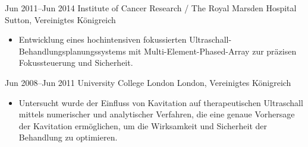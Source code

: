\documentclass[german, print]{cv-style-wide-de}
\begin{document}
\begin{entrylist}
\entry
  {Jun 2011--Jun 2014}
  {Institute of Cancer Research / The Royal Marsden Hospital}
  {Sutton, Vereinigtes Königreich}
  {%
   \begin{itemize}
     \item Entwicklung eines hochintensiven fokussierten Ultraschall-Behandlungsplanungssystems mit Multi-Element-Phased-Array zur präzisen Fokussteuerung und Sicherheit.
   \end{itemize}}


\entry
  {Jun 2008--Jun 2011}
  {University College London}
  {London, Vereinigtes Königreich}
  {
  	\begin{itemize}
      \item Untersucht wurde der Einfluss von Kavitation auf therapeutischen Ultraschall mittels numerischer und analytischer Verfahren, die eine genaue Vorhersage der Kavitation ermöglichen, um die Wirksamkeit und Sicherheit der Behandlung zu optimieren.
    \end{itemize}}

\end{entrylist}


\end{document}
